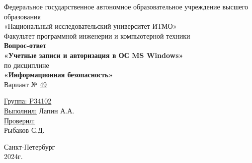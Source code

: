 \documentclass[a4paper, 14pt]{report}
\begin{document}
\newcommand{\nchapter}[1]{%
    \chapter*{#1} %
    \addcontentsline{toc}{chapter}{#1} %
}
\newcommand{\nsubsection}[1]{%
    \subsection*{#1} %
    \addcontentsline{toc}{subsection}{#1} %
}
\makeatletter

\renewcommand{\tableofcontents}{%
    \chapter*{\contentsname}%
    \addcontentsline{toc}{chapter}{\contentsname}%
    \@starttoc{toc}%
}
\makeatother

\begin{titlepage}
    \centering
    {\large Федеральное государственное автономное образовательное учреждение высшего образования}\\
    {\large «Национальный исследовательский университет ИТМО»}\\[0.5cm]

    {\large Факультет программной инженерии и компьютерной техники}\\[3cm]

    {\large \bfseries Вопрос-ответ}\\[0.5cm]
    {\large \bfseries «Учетные записи и авторизация в ОС MS Windows»}\\[0.5cm]
    {\large по дисциплине}\\[0.5cm]
    {\large \bfseries «Информационная безопасность»}\\[1cm]

    {\large Вариант № \underline{49}}\\[5cm]
    \begin{flushright}
        {\large \underline{Группа: P34102}}\\[0.5cm]
        {\large \underline{Выполнил:} Лапин А.А.}\\[1cm]

        {\large \underline{Проверил:}}\\
        {\large Рыбаков С.Д.}\\[7cm]
    \end{flushright}

    {\large Санкт-Петербург}\\
    {\large 2024г.}
\end{titlepage}
\end{document}
